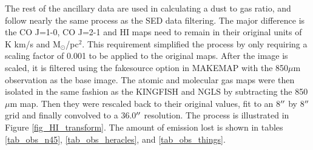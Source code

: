 The rest of the ancillary data are used in calculating a dust to gas ratio, and follow nearly the same process as the SED data filtering.  The major difference is the CO J=1-0, CO J=2-1 and HI maps need to remain in their original units of K km/s and M$_\odot$/pc$^2$.  This requirement simplified the process by only requiring a scaling factor of 0.001 to be applied to the original maps.  After the image is scaled, it is filtered using the fakesource option in MAKEMAP with the 850$\mu$m observation as the base image.  The atomic and molecular gas maps were then isolated in the same fashion as the KINGFISH and NGLS by subtracting the 850$\mu$m map.  Then they were rescaled back to their original values, fit to an 8$\mbox{$^{\prime\prime}$}$ by 8$\mbox{$^{\prime\prime}$}$ grid and finally convolved to a 36.0$\mbox{$^{\prime\prime}$}$ resolution.  The process is illustrated in Figure \ref{fig_HI_transform}.  The amount of emission lost is shown in tables \ref{tab_obs_n45}, \ref{tab_obs_heracles}, and \ref{tab_obs_things}.

